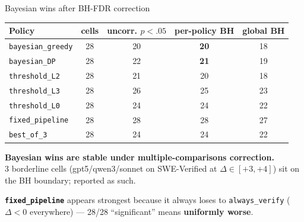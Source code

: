 \documentclass[10pt]{beamer}
\newcommand{\good}[1]{\textcolor{accentGreen}{\textbf{#1}}}
\newcommand{\bad}[1]{\textcolor{accentRed}{\textbf{#1}}}
\newcommand{\warn}[1]{\textcolor{accentOrange}{\textbf{#1}}}
\begin{document}
\begin{frame}{Bayesian wins after BH-FDR correction}
\vspace{0.3cm}
\begin{table}
\centering
\small
\begin{tabular}{lcccc}
\toprule
\rowcolor{paleBlue}\textbf{Policy} & \textbf{cells} & \textbf{uncorr. $p<.05$} & \textbf{per-policy BH} & \textbf{global BH} \\
\midrule
\rowcolor{paleGreen}\texttt{bayesian\_greedy} & 28 & 20 & \good{20} & 18 \\
\rowcolor{paleGreen}\texttt{bayesian\_DP} & 28 & 22 & \good{21} & 19 \\
\texttt{threshold\_L2} & 28 & 21 & 20 & 18 \\
\texttt{threshold\_L3} & 28 & 26 & 25 & 23 \\
\texttt{threshold\_L0} & 28 & 24 & 24 & 22 \\
\rowcolor{paleRed}\texttt{fixed\_pipeline} & 28 & 28 & 28 & 27 \\
\texttt{best\_of\_3} & 28 & 24 & 24 & 22 \\
\bottomrule
\end{tabular}
\end{table}
\vspace{0.2cm}
\good{Bayesian wins are stable under multiple-comparisons correction.}\\
3 borderline cells (gpt5/qwen3/sonnet on SWE-Verified at $\Delta \in
[+3, +4]$) sit on the BH boundary; reported as such.

\warn{\texttt{fixed\_pipeline}} appears strongest because it always loses to
\texttt{always\_verify} ($\Delta < 0$ everywhere) --- 28/28 ``significant''
means \bad{uniformly worse}.
\end{frame}


\end{document}
